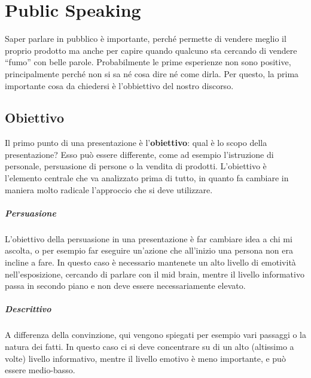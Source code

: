 
\chapter{Public Speaking}

Saper parlare in pubblico è importante, perché permette di vendere meglio il
proprio prodotto ma anche per capire quando qualcuno sta cercando di vendere
``fumo'' con belle parole. Probabilmente le prime esperienze non sono positive,
principalmente perché non si sa né cosa dire né come dirla. Per questo, la
prima importante cosa da chiedersi è l'obbiettivo del nostro discorso.

\section{Obiettivo}

Il primo punto di una presentazione è l'\textbf{obiettivo}: qual è lo scopo
della presentazione? Esso può essere differente, come ad esempio l'istruzione
di personale, persuasione di persone o la vendita di prodotti. L'obiettivo è
l'elemento centrale che va analizzato prima di tutto, in quanto fa
cambiare in maniera molto radicale l'approccio che si deve utilizzare.

\paragraph*{Persuasione} L'obiettivo della persuasione in una presentazione è
far cambiare idea a chi mi ascolta, o per esempio far eseguire un'azione che
all'inizio una persona non era incline a fare. In questo caso è necessario
mantenete un alto livello di emotività nell'esposizione, cercando di parlare
con il mid brain, mentre il livello informativo passa in secondo piano e non
deve essere necessariamente elevato.

\paragraph*{Descrittivo} A differenza della convinzione, qui vengono spiegati
per esempio vari passaggi o la natura dei fatti. In questo caso ci si deve
concentrare su di un alto (altissimo a volte) livello informativo, mentre il
livello emotivo è meno importante, e può essere medio-basso.

